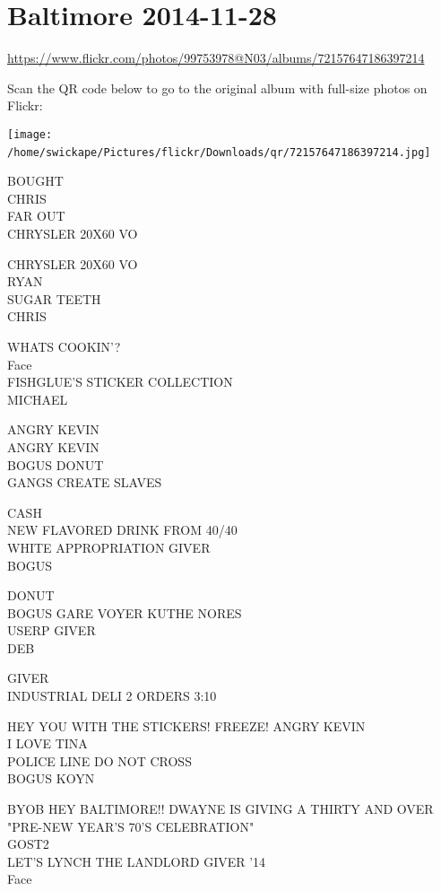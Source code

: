 \documentclass[10pt,letterpaper]{article}
\begin{document}
\section*{Baltimore 2014-11-28}

\url{https://www.flickr.com/photos/99753978@N03/albums/72157647186397214}

Scan the QR code below to go to the original album with full-size photos on Flickr:

\texttt{[image: /home/swickape/Pictures/flickr/Downloads/qr/72157647186397214.jpg]}
\

BOUGHT\\
CHRIS\\
FAR OUT\\
CHRYSLER 20X60 VO

CHRYSLER 20X60 VO\\
RYAN\\
SUGAR TEETH\\
CHRIS

WHATS COOKIN'?\\
Face\\
FISHGLUE'S STICKER COLLECTION\\
MICHAEL

ANGRY KEVIN\\
ANGRY KEVIN\\
BOGUS DONUT\\
GANGS CREATE SLAVES

CASH\\
NEW FLAVORED DRINK FROM 40/40\\
WHITE APPROPRIATION GIVER\\
BOGUS

DONUT\\
BOGUS GARE VOYER KUTHE NORES\\
USERP GIVER\\
DEB

GIVER\\
INDUSTRIAL DELI 2 ORDERS 3:10

HEY YOU WITH THE STICKERS!  FREEZE!  ANGRY KEVIN\\
I LOVE TINA\\
POLICE LINE DO NOT CROSS\\
BOGUS KOYN

BYOB HEY BALTIMORE!! DWAYNE IS GIVING A THIRTY AND OVER "PRE{-}NEW YEAR'S 70'S CELEBRATION"\\
GOST2\\
LET'S LYNCH THE LANDLORD GIVER '14\\
Face
\end{document}
